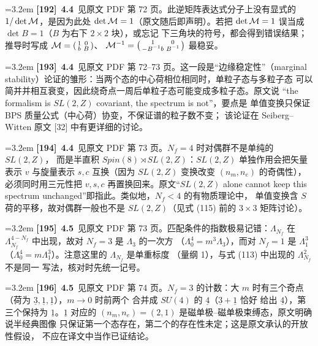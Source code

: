 \par
\par\medskip\noindent\hangindent=3.2em \textbf{[192]}~\textbf{4.4}~见原文 PDF 第 72 页。此逆矩阵表达式分子上没有显式的 $1/\det{\cal M}$，是因为此处 $\det{\cal M}=1$（原文随后即声明）。若把 $\det{\cal M}=1$ 误当成 $\det B=1$（$B$ 为右下 $2\times2$ 块），或忘记 下三角块的符号，都会得到错误结果；推导时写成 ${\cal M}=\left(\begin{smallmatrix}1&0\\ b&B\end{smallmatrix}\right)$、 ${\cal M}^{-1}=\left(\begin{smallmatrix}1&0\\ -B^{-1}b&B^{-1}\end{smallmatrix}\right)$ 最稳妥。
\par
\par\medskip\noindent\hangindent=3.2em \textbf{[193]}~\textbf{4.4}~见原文 PDF 第 72--73 页。这一段是“边缘稳定性”（marginal stability）论证的雏形：当两个态的中心荷相位相同时，单粒子态与多粒子态 可以简并并相互衰变，因此绕奇点一周后单粒子态可能变成多粒子态。原文说 “the formalism is $SL(2,Z)$ covariant, the spectrum is not”，要点是 单值变换只保证 BPS 质量公式（中心荷）协变，不保证谱的粒子数不变； 该论证在 Seiberg--Witten 原文 [32] 中有更详细的讨论。
\par
\par\medskip\noindent\hangindent=3.2em \textbf{[194]}~\textbf{4.4}~见原文 PDF 第 73 页。$N_f=4$ 时对偶群不是单纯的 $SL(2,Z)$， 而是半直积 $Spin(8)\rtimes SL(2,Z)$：$SL(2,Z)$ 单独作用会把矢量表示 $v$ 与旋量表示 $s,c$ 互换（因为 $SL(2,Z)$ 变换改变 $(n_m,n_e)$ 的奇偶性）， 必须同时用三元性把 $v,s,c$ 再置换回来。原文“$SL(2,Z)$ alone cannot keep this spectrum unchanged”即指此。类似地，$N_f<4$ 的有物质理论中， 单值变换含 $S$ 荷的平移，故对偶群一般也不是 $SL(2,Z)$（见式 (115) 前的 $3\times3$ 矩阵讨论）。
\par
\par\medskip\noindent\hangindent=3.2em \textbf{[195]}~\textbf{4.5}~见原文 PDF 第 73 页。匹配条件的指数极易记错：$\Lambda_{N_f}$ 在 $\Lambda_{N_f}^{4-N_f}$ 中出现，故对 $N_f=3$ 是 $\Lambda_3$ 的一次方 （$\Lambda_0^4=m^3\Lambda_3$），而对 $N_f=1$ 是 $\Lambda_1^3$ （$\Lambda_0^4=m\Lambda_1^3$）。注意这里的 $\Lambda_{N_f}$ 是单重标度 （量纲 1），与式 (113) 中出现的 $\Lambda^2_{N_f}$ 不是同一 写法，核对时先统一记号。
\par
\par\medskip\noindent\hangindent=3.2em \textbf{[196]}~\textbf{4.5}~见原文 PDF 第 74 页。$N_f=3$ 的计数：大 $m$ 时有三个奇点 （荷为 $\underline{3},\underline{1},\underline{1}$），$m\to0$ 时前两个 合并成 $SU(4)$ 的 $\underline{4}$（$\underline{3}+\underline{1}$ 恰好 给出 $\underline{4}$），第三个保持为 $\underline{1}$。$\underline{1}$ 对应的 $(n_m,n_e)=(2,1)$ 是磁单极--磁单极束缚态，原文明确说半经典图像 只保证第一个态存在，第二个的存在性未定；这是原文承认的开放性假设， 不应在译文中当作已证结论。
